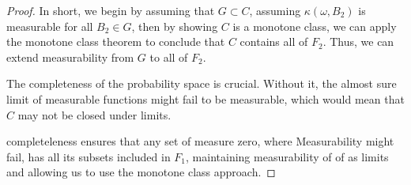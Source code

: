 \documentclass{article}
\begin{document}
\begin{proof}
    \par In short, we begin by assuming that $G\subset C$, assuming $\kappa( \omega, B_2)$ is measurable for all $B_2\in G$, then by showing $C$ is a monotone class, we can apply the monotone class theorem to conclude that $C$ contains all of $F_2$. Thus, we can extend measurability from $G$ to all of $F_2$.
    \par The completeness of the probability space is crucial. Without it, the almost sure limit of measurable functions might fail to be measurable, which would mean that $C$ may not be closed under limits.
    \par completeleness ensures that any set of measure zero, where Measurability might fail, has all its subsets included in $F_1$, maintaining measurability of of as limits and allowing us to use the monotone class approach.
\end{proof}
\end{document}
